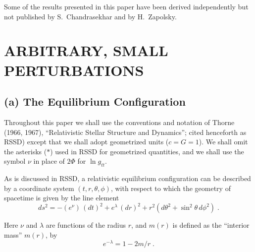 Some of the results presented in this paper have been derived independently but not
published by S.\ Chandrasekhar and by H.\ Zapolsky.

\section{ARBITRARY, SMALL PERTURBATIONS}

\subsection*{(a) The Equilibrium Configuration}

Throughout this paper we shall use the conventions and notation of Thorne (1966,
1967), ``Relativistic Stellar Structure and Dynamics''; cited henceforth as RSSD) except
that we shall adopt geometrized units ($c = G = 1$). We shall omit the
asterisks ($*$) used in RSSD for geometrized quantities, and we shall use the symbol $\nu$ in
place of $2\Phi$ for $\ln g_{tt}$.

As is discussed in RSSD, a relativistic equilibrium configuration can be described by a
coordinate system $(t, r, \theta, \phi)$, with respect to which the geometry of spacetime is given
by the line element
\begin{equation}
  ds^{2} = -(e^{\nu})\,(dt)^{2} + e^{\lambda}\,(dr)^{2} + r^{2}(d\theta^{2} + \sin^{2}\theta\,d\phi^{2})\;.
\label{eq:1}
\end{equation}

Here $\nu$ and $\lambda$ are functions of the radius $r$, and $m(r)$ is defined as the ``interior
mass'' $m(r)$, by
\begin{equation}
  e^{-\lambda} = 1 - 2m/r\;.
\label{eq:2}
\end{equation}
